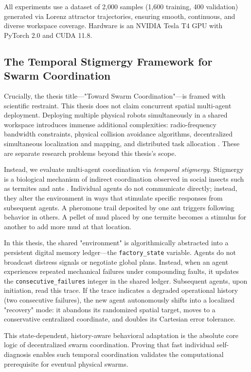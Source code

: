\documentclass[12pt,a4paper,oneside]{report}
\begin{document}
All experiments use a dataset of 2,000 samples (1,600 training, 400 validation) generated via Lorenz attractor trajectories, ensuring smooth, continuous, and diverse workspace coverage. Hardware is an NVIDIA Tesla T4 GPU with PyTorch 2.0 and CUDA 11.8.

\subsection{The Temporal Stigmergy Framework for Swarm Coordination}
\label{subsec:temporal_stigmergy_framework}

Crucially, the thesis title—"Toward Swarm Coordination"—is framed with scientific restraint. This thesis does not claim concurrent spatial multi-agent deployment. Deploying multiple physical robots simultaneously in a shared workspace introduces immense additional complexities: radio-frequency bandwidth constraints, physical collision avoidance algorithms, decentralized simultaneous localization and mapping, and distributed task allocation \cite{matsuki2024gaussian, keetha2024splattam}. These are separate research problems beyond this thesis's scope.

Instead, we evaluate multi-agent coordination via \textit{temporal stigmergy}. Stigmergy is a biological mechanism of indirect coordination observed in social insects such as termites and ants \cite{bongard2006resilient}. Individual agents do not communicate directly; instead, they alter the environment in ways that stimulate specific responses from subsequent agents. A pheromone trail deposited by one ant triggers following behavior in others. A pellet of mud placed by one termite becomes a stimulus for another to add more mud at that location.

In this thesis, the shared "environment" is algorithmically abstracted into a persistent digital memory ledger—the \texttt{factory\_state} variable. Agents do not broadcast distress signals or negotiate global plans. Instead, when an agent experiences repeated mechanical failures under compounding faults, it updates the \texttt{consecutive\_failures} integer in the shared ledger. Subsequent agents, upon initiation, read this trace. If the trace indicates a degraded operational history (two consecutive failures), the new agent autonomously shifts into a localized "recovery" mode: it abandons its randomized spatial target, moves to a conservative centralized coordinate, and doubles its Cartesian error tolerance.

This state-dependent, history-aware behavioral adaptation is the absolute core logic of decentralized swarm coordination. Proving that fast individual self-diagnosis enables such temporal coordination validates the computational prerequisite for eventual physical swarms.
\end{document}
